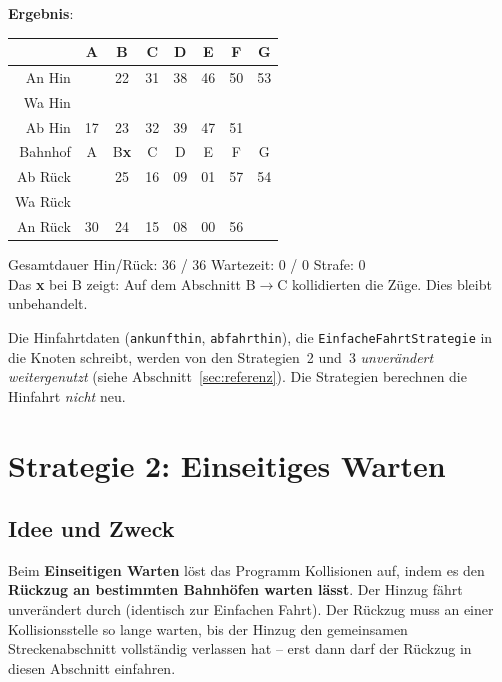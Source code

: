 \documentclass[12pt,a4paper]{article}
\begin{document}
\begin{beispielbox}[title={Einfache Fahrt -- Beispiel2: A--B--C--D--E--F--G, Abstände: 5 8 6 7 3 2, Start: 17}]
\textbf{Ergebnis}:
\begin{center}
\begin{tabular}{r|ccccccc}
 & A & B & C & D & E & F & G \\
\hline
An Hin  &    & 22 & 31 & 38 & 46 & 50 & 53 \\
Wa Hin  &    &    &    &    &    &    &    \\
Ab Hin  & 17 & 23 & 32 & 39 & 47 & 51 &    \\
\hline
Bahnhof & A  & B\textbf{x} & C & D & E & F & G \\
\hline
Ab Rück &    & 25 & 16 & 09 & 01 & 57 & 54 \\
Wa Rück &    &    &    &    &    &    &    \\
An Rück & 30 & 24 & 15 & 08 & 00 & 56 &    \\
\end{tabular}
\end{center}

Gesamtdauer Hin/Rück: 36 / 36 \quad Wartezeit: 0 / 0 \quad Strafe: 0 \\[4pt]
Das \textbf{x} bei B zeigt: Auf dem Abschnitt B$\to$C kollidierten die Züge. Dies bleibt unbehandelt.
\end{beispielbox}

\begin{hinweisbox}
Die Hinfahrtdaten (\texttt{ankunfthin}, \texttt{abfahrthin}), die \texttt{EinfacheFahrtStrategie} in die Knoten schreibt, werden von den Strategien~2 und~3 \emph{unverändert weitergenutzt} (siehe Abschnitt~\ref{sec:referenz}). Die Strategien berechnen die Hinfahrt \emph{nicht} neu.
\end{hinweisbox}

\section{Strategie 2: Einseitiges Warten}

\subsection{Idee und Zweck}

Beim \textbf{Einseitigen Warten} löst das Programm Kollisionen auf, indem es den \textbf{Rückzug an bestimmten Bahnhöfen warten lässt}. Der Hinzug fährt unverändert durch (identisch zur Einfachen Fahrt). Der Rückzug muss an einer Kollisionsstelle so lange warten, bis der Hinzug den gemeinsamen Streckenabschnitt vollständig verlassen hat -- erst dann darf der Rückzug in diesen Abschnitt einfahren.
\end{document}
